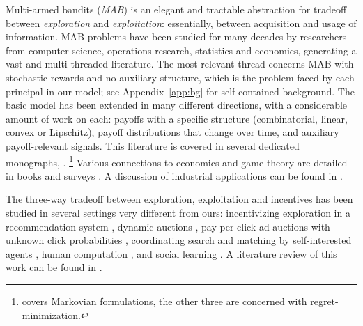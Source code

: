
 Multi-armed bandits (\emph{MAB}) is an elegant and tractable abstraction for tradeoff between \emph{exploration} and \emph{exploitation}: essentially, between acquisition and usage of information. MAB problems have been studied for many decades by researchers from computer science, operations research, statistics and economics, generating a vast and multi-threaded literature.  The most relevant thread concerns MAB with stochastic rewards and no auxiliary structure, which is the problem faced by each principal in our model; see Appendix~\ref{app:bg} for self-contained background. The basic model has been extended in many different directions, with a considerable amount of work on each: \eg payoffs with a specific structure (\eg combinatorial, linear, convex or Lipschitz), payoff distributions that change over time, and auxiliary payoff-relevant signals. This literature is covered in several dedicated monographs,
\citep{Gittins-book11,Bubeck-survey12,slivkins-MABbook,LS19bandit-book}.%
\footnote{\citet{Gittins-book11} covers Markovian formulations, the other three are concerned with regret-minimization.}
Various connections to economics and game theory are detailed in 
books \citep{CesaBL-book,slivkins-MABbook} and surveys \citep{Bergemann-survey06,Horner-survey16}. A discussion of industrial applications can be found in \citep{DS-arxiv}.

The three-way tradeoff between exploration, exploitation and incentives has been studied in several settings very different from ours:
incentivizing exploration in a recommendation system
    \citep[\eg][]{Che-13,Frazier-ec14,Kremer-JPE14,ICexploration-ec15,Bimpikis-exploration-ms17,Bahar-ec16,Jieming-unbiased18},
dynamic auctions
    \citep[\eg][]{AtheySegal-econometrica13,DynPivot-econometrica10,Kakade-pivot-or13},
pay-per-click ad auctions with unknown click probabilities
    \citep[\eg][]{MechMAB-ec09,DevanurK09,Transform-ec10-jacm},
coordinating search and matching by self-interested agents
    \citep{Bobby-Glen-ec16},
human computation
    \citep[\eg][]{RepeatedPA-ec14,Ghosh-itcs13,Krause-www13},
and social learning 
    \citep[\eg][]{Bolton-econometrica99,Keller-econometrica05,Johari-ec12}. 
A literature review of this work can be found in 
\citep[Ch. 11.6]{slivkins-MABbook}.


